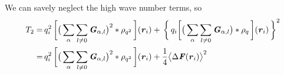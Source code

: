 \documentclass[aps,pre,preprint]{revtex4}
\renewcommand{\v}[1]{\textbf{\textit{#1}}}
\begin{document}
We can savely neglect the high wave number terms, so
\begin{align}\nonumber
  T_2
  = &\,
  q_i^2\,
  \bigg[
  \big(
  \sum_{\alpha} \sum_{l\neq 0}  
  \v G_{\alpha,l}
  \big)^2
  \ast \rho_{q^2}\,
  \bigg] (\v r_i) 
  + \,
  \bigg\{\,
  q_i
  \bigg[
  \big(\sum_{\alpha}\sum_{l\neq 0}
  \v G_{\alpha,l}
  \big)
  \ast\rho_q\,
  \bigg] (\v r_i)
  \,\bigg\}^2  \\ \nonumber
  = &\,
  q_i^2\,
  \bigg[
  \big(
  \sum_{\alpha} \sum_{l\neq 0}  
  \v G_{\alpha,l}
  \big)^2
  \ast \rho_{q^2}\,
  \bigg] (\v r_i)
  + 
  \frac14\big\langle\Delta\v F(\v r_i)\big\rangle^2
\end{align}
\end{document}
